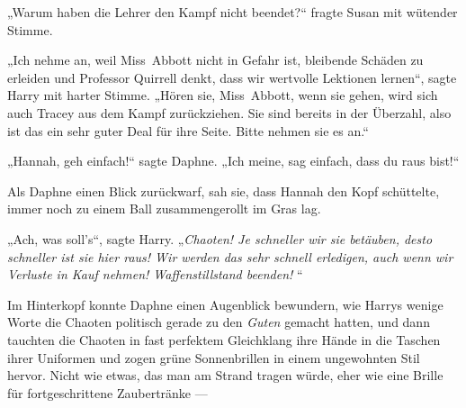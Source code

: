 „Warum haben die Lehrer den Kampf nicht beendet?“ fragte Susan mit wütender Stimme.

„Ich nehme an, weil Miss~Abbott nicht in Gefahr ist, bleibende Schäden zu erleiden und Professor Quirrell denkt, dass wir wertvolle Lektionen lernen“, sagte Harry mit harter Stimme.
„Hören sie, Miss~Abbott, wenn sie gehen, wird sich auch Tracey aus dem Kampf zurückziehen. Sie sind bereits in der Überzahl, also ist das ein sehr guter Deal für ihre Seite. Bitte nehmen sie es an.“

„Hannah, geh einfach!“ sagte Daphne.
„Ich meine, sag einfach, dass du raus bist!“

Als Daphne einen Blick zurückwarf, sah sie, dass Hannah den Kopf schüttelte, immer noch zu einem Ball zusammengerollt im Gras lag.

„Ach, was soll’s“, sagte Harry.
„\emph{Chaoten! Je schneller wir sie betäuben, desto schneller ist sie hier raus! Wir werden das sehr schnell erledigen, auch wenn wir Verluste in Kauf nehmen! Waffenstillstand beenden! }“

Im Hinterkopf konnte Daphne einen Augenblick bewundern, wie Harrys wenige Worte die Chaoten politisch gerade zu den \emph{Guten} gemacht hatten, und dann tauchten die Chaoten in fast perfektem Gleichklang ihre Hände in die Taschen ihrer Uniformen und zogen grüne Sonnenbrillen in einem ungewohnten Stil hervor. Nicht wie etwas, das man am Strand tragen würde, eher wie eine Brille für fortgeschrittene Zaubertränke —

